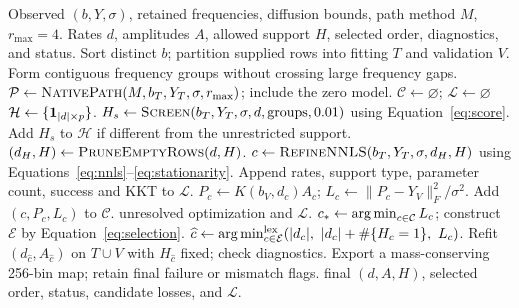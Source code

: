 \begin{algorithm}[H]
\caption{Automatic spectral-support selection for RAI-S and DOME-S}\label{alg:support}
\begin{algorithmic}[1]
\Require Observed $(b,Y,\sigma)$, retained frequencies, diffusion bounds, path method $M$, $r_{\max}=4$.
\Ensure Rates $d$, amplitudes $A$, allowed support $H$, selected order, diagnostics, and status.
\State Sort distinct $b$; partition supplied rows into fitting $T$ and validation $V$.
\State Form contiguous frequency groups without crossing large frequency gaps.
\State $\mathcal P\gets\Call{NativePath}{M,b_T,Y_T,\sigma,r_{\max}}$; include the zero model.
\State $\mathcal C\gets\varnothing$; $\mathcal L\gets\varnothing$ 
  \State $\mathcal H\gets\{\mathbf{1}_{|d|\times p}\}$.
    \State $H_s\gets\Call{Screen}{b_T,Y_T,\sigma,d,\text{groups},0.01}$ using Equation~\eqref{eq:score}.
    \State Add $H_s$ to $\mathcal H$ if different from the unrestricted support.
  \EndIf
    \State $ (d_H,H)\gets\Call{PruneEmptyRows}{d,H}$.
    \State $c\gets\Call{RefineNNLS}{b_T,Y_T,\sigma,d_H,H}$ using Equations~\eqref{eq:nnls}--\eqref{eq:stationarity}.
    \State Append rates, support type, parameter count, success and KKT to $\mathcal L$.
      \State $P_c\gets K(b_V,d_c)A_c$; $L_c\gets\|P_c-Y_V\|_F^2/\sigma^2$.
      \State Add $(c,P_c,L_c)$ to $\mathcal C$.
    \EndIf
  \EndFor
\EndFor
{}
  \State \Return unresolved optimization and $\mathcal L$.
\EndIf
\State $c_*\gets\operatorname*{arg\,min}_{c\in\mathcal C}L_c$; construct $\mathcal E$ by Equation~\eqref{eq:selection}.
\State $\widehat c\gets\operatorname*{arg\,min}_{c\in\mathcal E}^{\rm lex}(|d_c|,\ |d_c|+\#\{H_c=1\},\ L_c)$.
\State Refit $(d_{\widehat c},A_{\widehat c})$ on $T\cup V$ with $H_{\widehat c}$ fixed; check diagnostics.
\State Export a mass-conserving 256-bin map; retain final failure or mismatch flags.
\State \Return final $(d,A,H)$, selected order, status, candidate losses, and $\mathcal L$.
\end{algorithmic}
\end{algorithm}
